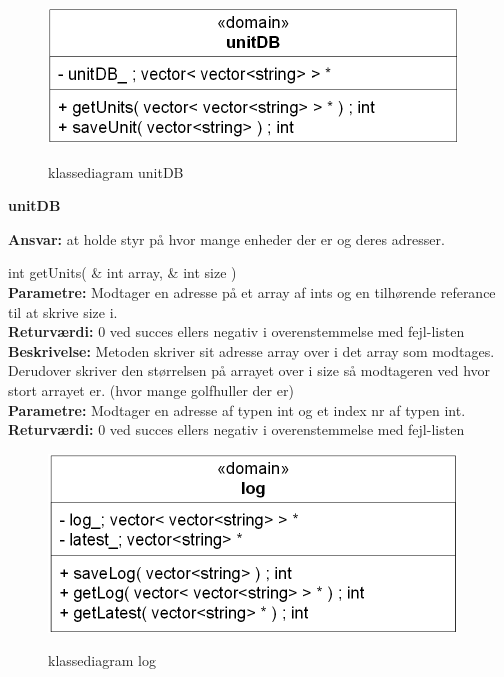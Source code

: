 \newpage

\begin{figure}[htbp] \centering
{\includegraphics[scale=1.5]{filer/design/Klassediagrammer/sw_unitDB}}
\caption{klassediagram unitDB}
\label{fig:unitDB klassediagram}
\end{figure} 

{\centering
\textbf{unitDB}\par
}
\textbf{Ansvar:} at holde styr på hvor mange enheder der er og deres adresser. \

int getUnits( \& int array, \& int size ) \\
\textbf{Parametre:}  Modtager en adresse på et array af ints og en tilhørende referance til at skrive size i.\\
\textbf{Returværdi:} 0 ved succes ellers negativ i overenstemmelse med fejl-listen \\
\textbf{Beskrivelse:} Metoden skriver sit adresse array over i det array som modtages. Derudover skriver den størrelsen på arrayet over i size så modtageren ved hvor stort arrayet er. (hvor mange golfhuller der er)\\

\textbf{Parametre:} Modtager en adresse af typen int og et index nr af typen int. \\
\textbf{Returværdi:} 0 ved succes ellers negativ i overenstemmelse med fejl-listen \\

\begin{figure}[htbp] \centering
{\includegraphics[scale=1.5]{filer/design/Klassediagrammer/sw_log}}
\caption{klassediagram log}
\label{fig:log klassediagram}
\end{figure} 


